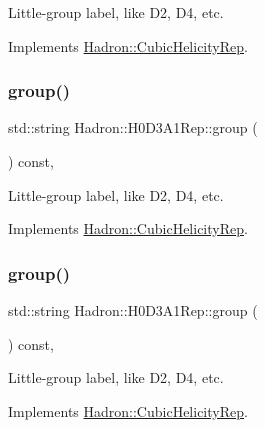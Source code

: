 Little-\/group label, like D2, D4, etc. 

Implements \mbox{\hyperlink{structHadron_1_1CubicHelicityRep_a101a7d76cd8ccdad0f272db44b766113}{Hadron\+::\+Cubic\+Helicity\+Rep}}.

\mbox{\label{structHadron_1_1H0D3A1Rep_acb3ae7caf69d50372d06639f12c8c72c}} 
\subsubsection{\texorpdfstring{group()}{group()}\hspace{0.1cm}{\footnotesize\ttfamily [3/5]}}
{\footnotesize\ttfamily std\+::string Hadron\+::\+H0\+D3\+A1\+Rep\+::group (\begin{DoxyParamCaption}{ }\end{DoxyParamCaption}) const\hspace{0.3cm}{\ttfamily [inline]}, {\ttfamily [virtual]}}

Little-\/group label, like D2, D4, etc. 

Implements \mbox{\hyperlink{structHadron_1_1CubicHelicityRep_a101a7d76cd8ccdad0f272db44b766113}{Hadron\+::\+Cubic\+Helicity\+Rep}}.

\mbox{\label{structHadron_1_1H0D3A1Rep_acb3ae7caf69d50372d06639f12c8c72c}} 
\subsubsection{\texorpdfstring{group()}{group()}\hspace{0.1cm}{\footnotesize\ttfamily [4/5]}}
{\footnotesize\ttfamily std\+::string Hadron\+::\+H0\+D3\+A1\+Rep\+::group (\begin{DoxyParamCaption}{ }\end{DoxyParamCaption}) const\hspace{0.3cm}{\ttfamily [inline]}, {\ttfamily [virtual]}}

Little-\/group label, like D2, D4, etc. 

Implements \mbox{\hyperlink{structHadron_1_1CubicHelicityRep_a101a7d76cd8ccdad0f272db44b766113}{Hadron\+::\+Cubic\+Helicity\+Rep}}.

\mbox{\label{structHadron_1_1H0D3A1Rep_acb3ae7caf69d50372d06639f12c8c72c}} 
